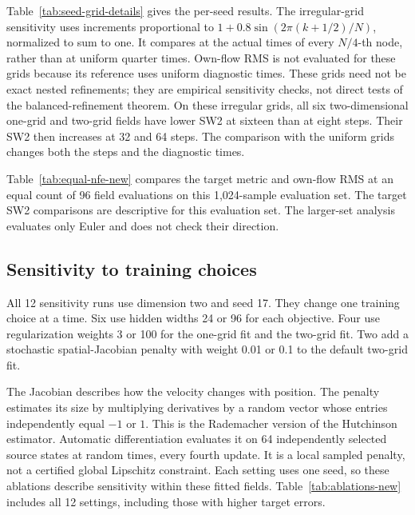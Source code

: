 Table~\ref{tab:seed-grid-details} gives the per-seed results. The
irregular-grid sensitivity uses increments proportional to
$1+0.8\sin(2\pi(k+1/2)/N)$, normalized to sum to one. It compares at the
actual times of every $N/4$-th node, rather than at uniform quarter times. Own-flow RMS is not evaluated
for these grids because its reference uses uniform diagnostic times. These grids need not be exact nested
refinements; they are empirical sensitivity checks, not direct tests of the
balanced-refinement theorem.
On these irregular grids, all six two-dimensional one-grid and
two-grid fields have lower SW2 at sixteen than at eight steps. Their
SW2 then increases at 32 and 64 steps. The comparison with the uniform
grids changes both the steps and the diagnostic times.

Table~\ref{tab:equal-nfe-new} compares the target metric and own-flow
RMS at an equal count of 96 field evaluations on this 1,024-sample evaluation set.
The target SW2 comparisons are descriptive for this evaluation set. The larger-set
analysis evaluates only Euler and does not check their direction.




\subsection{Sensitivity to training choices}
All 12 sensitivity runs use dimension two and seed 17. They change one
training choice at a time. Six use hidden widths 24 or 96 for each
objective. Four use regularization weights 3 or 100 for the one-grid fit and the two-grid fit. Two add a stochastic spatial-Jacobian penalty with
weight 0.01 or 0.1 to the default two-grid fit.

The Jacobian describes how the velocity changes with position. The penalty
estimates its size by multiplying derivatives by a random vector whose
entries independently equal $-1$ or $1$. This is the Rademacher version of
the Hutchinson estimator. Automatic differentiation
evaluates it on 64 independently selected source states at random times,
every fourth update. It is a local sampled penalty, not a certified global Lipschitz
constraint. Each setting uses one seed, so these ablations describe sensitivity
within these fitted fields. Table~\ref{tab:ablations-new} includes all
12 settings, including those with higher target errors.



